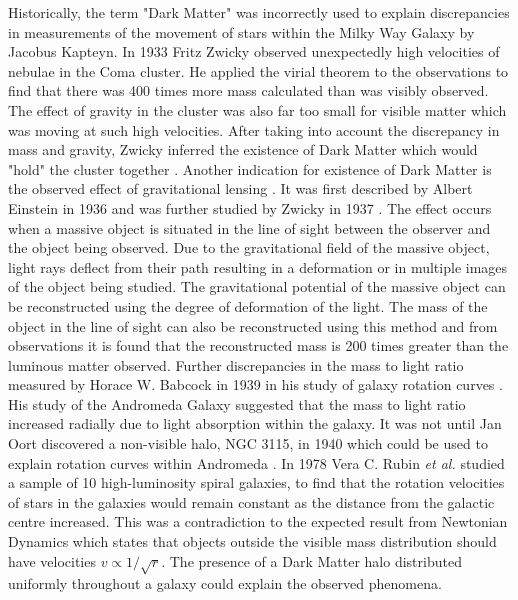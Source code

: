 Historically, the term "Dark Matter" was incorrectly used to explain discrepancies in measurements of the movement of stars within the Milky Way Galaxy by Jacobus Kapteyn. In 1933 Fritz Zwicky observed unexpectedly high velocities of nebulae in the Coma cluster. He applied the virial theorem to the observations to find that there was 400 times more mass calculated than was visibly observed. The effect of gravity in the cluster was also far too small for visible matter which was moving at such high velocities. After taking into account the discrepancy in mass and gravity, Zwicky inferred the existence of Dark Matter which would "hold" the cluster together \cite{Zwicky1933}. 
\newline
Another indication for existence of Dark Matter is the observed effect of gravitational lensing \cite{GravLens}. It was first described by Albert Einstein in 1936 \cite{Einstin1936} and was further studied by Zwicky in 1937 \cite{Zwicky1937}. The effect occurs when a massive object is situated in the line of sight between the observer and the object being observed. Due to the gravitational field of the massive object, light rays deflect from their path resulting in a deformation or in multiple images of the object being studied. The gravitational potential of the massive object can be reconstructed using the degree of deformation of the light. The mass of the object in the line of sight can also be reconstructed using this method and from observations it is found that the reconstructed mass is 200 times greater than the luminous matter observed.
\newline
Further discrepancies in the mass to light ratio measured by Horace W. Babcock in 1939 in his study of galaxy rotation curves \cite{RotationCurves}. His study of the Andromeda Galaxy suggested that the mass to light ratio increased radially due to light absorption within the galaxy. It was not until Jan Oort discovered a non-visible halo, NGC 3115, in 1940 which could be used to explain rotation curves within Andromeda \cite{Oort1940}. In 1978 Vera C. Rubin \textit{et al.}\cite{Rubin} studied a sample of 10 high-luminosity spiral galaxies, to find that the rotation velocities of stars in the galaxies would remain constant as the distance from the galactic centre increased. This was a contradiction to the expected result from Newtonian Dynamics which states that objects outside the visible mass distribution should have velocities $v \propto 1/\sqrt{r}$. The presence of a Dark Matter halo distributed uniformly throughout a galaxy could explain the observed phenomena.

